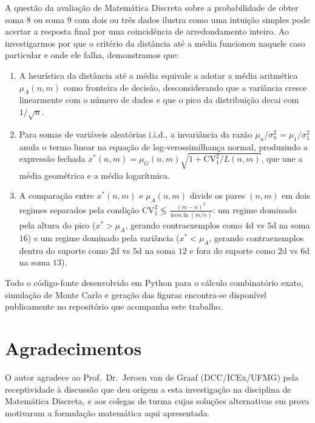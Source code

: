 \documentclass[11pt,a4paper]{article}
\theoremstyle{definition}
\theoremstyle{remark}
\begin{document}
A questão da avaliação de Matemática Discreta sobre a probabilidade de obter soma $8$ ou soma $9$ com dois ou três dados ilustra como uma intuição simples pode acertar a resposta final por uma coincidência de arredondamento inteiro. Ao investigarmos por que o critério da distância até a média funcionou naquele caso particular e onde ele falha, demonstramos que:
\begin{enumerate}[topsep=0.2em, itemsep=0.15em]
    \item A heurística da distância até a média equivale a adotar a média aritmética $\mu_A(n,m)$ como fronteira de decisão, desconsiderando que a variância cresce linearmente com o número de dados e que o pico da distribuição decai com $1/\sqrt{n}$.
    \item Para somas de variáveis aleatórias i.i.d., a invariância da razão $\mu_n / \sigma_n^2 = \mu_1 / \sigma_1^2$ anula o termo linear na equação de log-verossimilhança normal, produzindo a expressão fechada $x^*(n,m) = \mu_G(n,m)\sqrt{1 + \mathrm{CV}_1^2 / L(n,m)}$, que une a média geométrica e a média logarítmica.
    \item A comparação entre $x^*(n,m)$ e $\mu_A(n,m)$ divide os pares $(n,m)$ em dois regimes separados pela condição $\mathrm{CV}_1^2 \lessgtr \frac{(m-n)^3}{4nm\ln(m/n)}$: um regime dominado pela altura do pico ($x^* > \mu_A$, gerando contraexemplos como $4\text{d}$ vs $5\text{d}$ na soma $16$) e um regime dominado pela variância ($x^* < \mu_A$, gerando contraexemplos dentro do suporte como $2\text{d}$ vs $5\text{d}$ na soma $12$ e fora do suporte como $2\text{d}$ vs $6\text{d}$ na soma $13$).
\end{enumerate}

Todo o código-fonte desenvolvido em Python para o cálculo combinatório exato, simulação de Monte Carlo e geração das figuras encontra-se disponível publicamente no repositório que acompanha este trabalho.

\section*{Agradecimentos}

O autor agradece ao Prof.\ Dr.\ Jeroen van de Graaf (DCC/ICEx/UFMG) pela receptividade à discussão que deu origem a esta investigação na disciplina de Matemática Discreta, e aos colegas de turma cujas soluções alternativas em prova motivaram a formulação matemática aqui apresentada.



\end{document}
